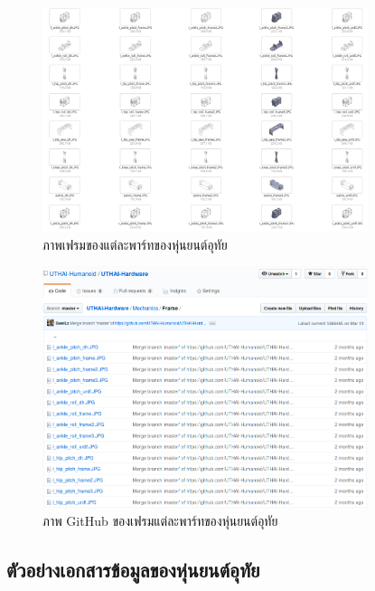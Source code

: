 \begin{figure}[!ht]
	\centering
	\includegraphics[width=0.85\textwidth]{chapter4/images/uthai_manual/uthai_frame.png}
	\caption{ภาพเฟรมของแต่ละพาร์ทของหุ่นยนต์อุทัย}
\end{figure}
\begin{figure}[!ht]
	\centering
	\includegraphics[width=0.85\textwidth]{chapter4/images/uthai_manual/uthai_frame2.png}
	\caption{ภาพ GitHub ของเฟรมแต่ละพาร์ทของหุ่นยนต์อุทัย}
\end{figure}

\clearpage
\subsection{ตัวอย่างเอกสารข้อมูลของหุ่นยนต์อุทัย}

